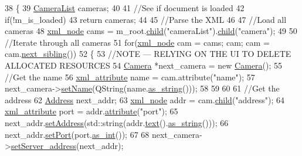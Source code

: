 \begin{DoxyCode}
38 \{
39     \hyperlink{camera_8h_a4e5cc6bdc5723a4d61f3aac69dbb083a}{CameraList} cameras;
40 
41     \textcolor{comment}{//See if document is loaded}
42     \textcolor{keywordflow}{if}(!m\_is\_loaded)
43         \textcolor{keywordflow}{return} cameras;
44 
45     \textcolor{comment}{//Parse the XML}
46 
47     \textcolor{comment}{//Load all cameras}
48     \hyperlink{classpugi_1_1xml__node}{xml\_node} cams = m\_root.\hyperlink{classpugi_1_1xml__node_af3aa192b114a289640110c9e4da020ca}{child}(\textcolor{stringliteral}{"cameraList"}).\hyperlink{classpugi_1_1xml__node_af3aa192b114a289640110c9e4da020ca}{child}(\textcolor{stringliteral}{"camera"});
49 
50     \textcolor{comment}{//Iterate through all cameras}
51     \textcolor{keywordflow}{for}(\hyperlink{classpugi_1_1xml__node}{xml\_node} cam = cams; cam; cam = cam.\hyperlink{classpugi_1_1xml__node_a713159ab981fb3f0a325434106dc94f5}{next\_sibling}())
52     \{
53         \textcolor{comment}{//NOTE --- RELYING ON THE UI TO DELETE ALLOCATED RESOURCES}
54         \hyperlink{classCamera}{Camera} *next\_camera = \textcolor{keyword}{new} \hyperlink{classCamera}{Camera}();
55         \textcolor{comment}{//Get the name}
56         \hyperlink{classpugi_1_1xml__attribute}{xml\_attribute} name = cam.attribute(\textcolor{stringliteral}{"name"});
57         next\_camera->\hyperlink{classCamera_a4f009de64587caa5e2a91a2cdd18fd32}{setName}(QString(name.\hyperlink{classpugi_1_1xml__attribute_a583f470d768f5f8a4df0ebb2e016a88d}{as\_string}()));
58 
59 
60 
61         \textcolor{comment}{//Get the address}
62         \hyperlink{classAddress}{Address} next\_addr;
63         \hyperlink{classpugi_1_1xml__node}{xml\_node} addr = cam.\hyperlink{classpugi_1_1xml__node_af3aa192b114a289640110c9e4da020ca}{child}(\textcolor{stringliteral}{"address"});
64         \hyperlink{classpugi_1_1xml__attribute}{xml\_attribute} port = addr.\hyperlink{classpugi_1_1xml__node_a19fc1a285c0f751f52c0e151a727de97}{attribute}(\textcolor{stringliteral}{"port"});
65         next\_addr.\hyperlink{classAddress_a43ba5f8001b7e729b83b1b9299294495}{setAddress}(std::string(addr.\hyperlink{classpugi_1_1xml__node_aafe1c1c7cd27f3c9c758b517abc7886a}{text}().\hyperlink{classpugi_1_1xml__text_ac817e480d7ab09b3c6390622423a701b}{as\_string}()));
66         next\_addr.\hyperlink{classAddress_ad73c29200f7d63641e48ebfc16efaf75}{setPort}(port.\hyperlink{classpugi_1_1xml__attribute_afe009e964b9cec96c77495ef1ae6d91f}{as\_int}());
67 
68         next\_camera->\hyperlink{classCamera_a678d67d964307ffc9e323d74c7a28ca1}{setServer\_address}(next\_addr);

\end{DoxyCode}
